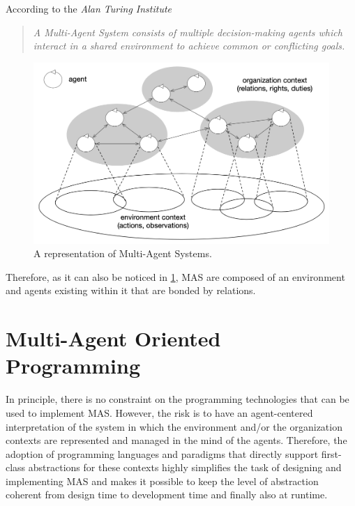 According to the \textit{Alan Turing Institute}~\cite{turing}
\begin{quote}
    \textit{A Multi-Agent System consists of multiple decision-making agents which interact in a shared environment to achieve common or conflicting goals.}
\end{quote}

\begin{figure}
    \centering
    \includegraphics[width=0.9\linewidth]{images/multi-agent-systems.png}
    \caption{A representation of Multi-Agent Systems.~\cite{jennings2000agent}}
    \label{fig:multi-agent-systems}
\end{figure}
Therefore, as it can also be noticed in \cref{fig:multi-agent-systems}, MAS are composed of an environment and agents existing within it that are bonded by relations.

\section{Multi-Agent Oriented Programming}
In principle, there is no constraint on the programming technologies that can be used to implement MAS.
However, the risk is to have an agent-centered interpretation of the system in which the environment and/or the organization contexts are represented and managed in the mind of the agents.
Therefore, the adoption of programming languages and paradigms that directly support first-class abstractions for these contexts highly simplifies the task of designing and implementing MAS and makes it possible to keep the level of abstraction coherent from design time to development time and finally also at runtime.

